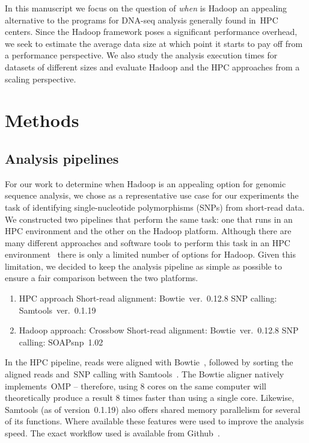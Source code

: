 \documentclass[10pt]{article}
\newcommand{\Fixme}[1]{{\color{FixmeColor}{#1}}}
\begin{document}
In this manuscript we focus on the question of {\it when} is Hadoop an appealing alternative to the programs for DNA-seq analysis generally found in~HPC centers.
Since the Hadoop framework poses a significant performance overhead, we seek to estimate the average data size at which point it starts to pay off from a performance perspective. We also study the analysis execution times for datasets of different sizes and evaluate Hadoop and the HPC approaches from a scaling perspective.


\section*{Methods}


\subsection*{Analysis pipelines}

For our work to determine when Hadoop is an appealing option for genomic
sequence analysis, we chose as a representative 
use case for our experiments the task of identifying
single-nucleotide polymorphisms (SNPs) from short-read data.  We constructed
two pipelines that perform the same task: one that runs in an HPC environment
and the other on the Hadoop platform.  Although there are many different
approaches and software tools to perform this task in an HPC environment~\cite{Li:2013fk} there is only a limited
number of options for Hadoop. Given this limitation, we decided to keep the
analysis pipeline as simple as possible to ensure a fair comparison between the
two platforms.

\begin{enumerate}
\item HPC approach
\subitem Short-read alignment: Bowtie~ver.~0.12.8
\subitem SNP calling: Samtools~ver.~0.1.19
\item Hadoop approach: Crossbow
\subitem Short-read alignment: Bowtie~ver.~0.12.8
\subitem SNP calling: SOAPsnp~1.02
\end{enumerate}


In the HPC pipeline, reads were aligned with Bowtie~\cite{Langmead:2009uq}, followed by sorting the aligned reads and~SNP calling with Samtools~\cite{samtools}. The Bowtie aligner natively implements~OMP -- therefore, using 8 cores on the same computer will theoretically produce a result 8 times faster than using a single core. Likewise, Samtools (as of version~0.1.19) also offers shared memory parallelism for several of its functions. Where available these features were used to improve the analysis speed. The exact workflow used is available from Github~\cite{code_repo_bash}.
\end{document}
